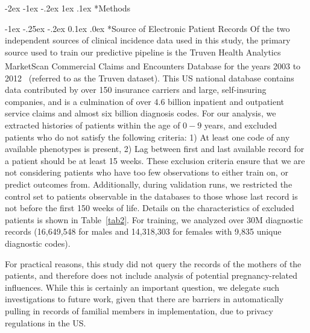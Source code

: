\documentclass[onecolumn,,10pt]{IEEEtran}
\makeatletter
\renewcommand\section{\@startsection {section}{1}{\z@}%
  {-2ex \@plus -1ex \@minus -.2ex}%
  {1ex \@plus.1ex}%
  {\Large\bfseries\scshape}}
\renewcommand\subsection{\@startsection {section}{1}{\z@}%
  {-1ex \@plus -.25ex \@minus -.2ex}%
  {0.1ex \@plus.0ex}%
  {\fontsize{11}{12}\selectfont\bfseries\sffamily\color{DodgerBlue4}}}
\makeatother
\begin{document}

\clearpage

\section*{Methods}


\subsection*{Source of Electronic Patient Records}
Of the two independent sources of clinical incidence data used in this study,  the primary source used to train our predictive pipeline  is the Truven Health Analytics  MarketScan\textsuperscript{\textregistered} Commercial Claims and Encounters Database for the years 2003 to 2012~\cite{hansen2017truven} (referred to  as the Truven dataset). 
 This US national database contains data contributed by over 150 insurance carriers and large, self-insuring companies, and is a culmination of over  4.6 billion inpatient and outpatient service claims and  almost six billion diagnosis codes.  For our analysis, we extracted histories of patients within the age of $0-9$ years, and excluded  patients who do not satisfy the following criteria: 1) At least one code of any available phenotypes is present, 2) Lag between first and last available record for a patient should be at least 15 weeks. These exclusion criteria ensure that we are not considering patients who have too few observations to either train on, or predict outcomes from. Additionally, during validation runs,  we restricted the control set to patients observable in the databases to those whose last record is not before the first 150 weeks of life. Details on the characteristics of excluded patients is shown in Table~\ref{tab2}.
For training, we analyzed over 30M diagnostic records (16,649,548 for males and  14,318,303  for females with 9,835 unique diagnostic codes).

For practical reasons, this study did not query the records of the mothers of the patients, and therefore does not include analysis of potential pregnancy-related influences. 
While this is certainly an important question, we delegate such investigations to future work, given that there are barriers in automatically  pulling in records of familial members in implementation, due to privacy regulations in the US.  
%
\end{document}
